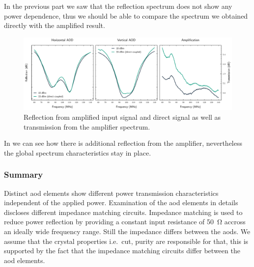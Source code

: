 In the previous part we saw that the reflection spectrum does not show any
power dependence, thus we should be able to compare the spectrum we obtained
directly with the amplified result.
\begin{figure}[htb]
  \centering
  \includegraphics[width=\textwidth]{../figure/signal/reflection/comparison.pdf}
  \caption{Reflection from amplified input signal and direct signal as well as
    transmission from the amplifier spectrum.
  }\label{fig:signal_reflection_comparison}
\end{figure}
In  we can see how there is additional
reflection from the amplifier, nevertheless the global spectrum
characteristics stay in place.

\subsubsection{Summary}

Distinct \gls{aod} elements show different power transmission characteristics
independent of the applied power. Examination of the \gls{aod} elements in
details discloses different impedance matching circuits. Impedance matching
is used to reduce power reflection by providing a constant input resistance
of \SI{50}{\ohm} accross an ideally wide frequency range. Still the impedance
differs between the \gls{aod}s. We assume that the crystal properties
i.e.\ cut, purity are responsible for that, this is supported by the fact
that the impedance matching circuits differ between the \gls{aod} elements.
